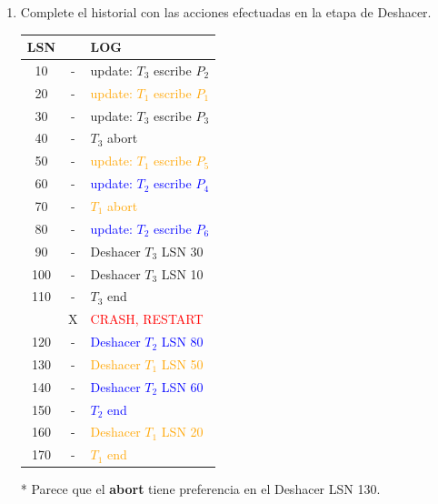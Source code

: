 \documentclass{templateNote}
\begin{document}
\begin{enumerate}
    \item Complete el historial con las acciones efectuadas en la etapa de Deshacer.
    
    \begin{minipage}{0.5\textwidth}
        \begin{center}
            \begin{tabular}{|c|c|l|}
                \hline
                \textbf{LSN} & & \textbf{LOG} \\ \hline
                10 & - & \textcolor{green!80!black}{update: $T_3$ escribe $P_2$} \\
                20 & - & \textcolor{orange}{update: $T_1$ escribe $P_1$} \\
                30 & - & \textcolor{green!80!black}{update: $T_3$ escribe $P_3$} \\
                40 & - & \textcolor{green!80!black}{$T_3$ abort} \\
                50 & - & \textcolor{orange}{update: $T_1$ escribe $P_5$} \\
                60 & - & \textcolor{blue}{update: $T_2$ escribe $P_4$} \\
                70 & - & \textcolor{orange}{$T_1$ abort} \\
                80 & - & \textcolor{blue}{update: $T_2$ escribe $P_6$} \\
                90 & - & \textcolor{green!80!black}{Deshacer $T_3$ LSN 30} \\
                100 & - & \textcolor{green!80!black}{Deshacer $T_3$ LSN 10} \\
                110 & - & \textcolor{green!80!black}{$T_3$ end} \\
                & X & \textcolor{red}{CRASH, RESTART} \\ \hline
                120 & - & \textcolor{blue}{Deshacer $T_2$ LSN 80} \\
                130 & - & \textcolor{orange}{Deshacer $T_1$ LSN 50} \\
                140 & - & \textcolor{blue}{Deshacer $T_2$ LSN 60} \\
                150 & - & \textcolor{blue}{$T_2$ end} \\
                160 & - & \textcolor{orange}{Deshacer $T_1$ LSN 20} \\
                170 & - & \textcolor{orange}{$T_1$ end} \\ \hline
            \end{tabular}   
        \end{center}
    \end{minipage}
    \hfill
    \begin{minipage}{0.4\textwidth}
        * Parece que el \textbf{abort} tiene preferencia en el Deshacer LSN 130.
    \end{minipage}
\end{enumerate}
\end{document}
